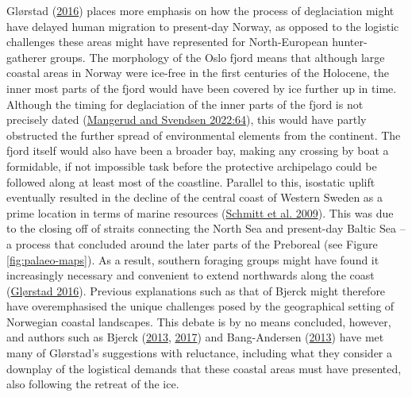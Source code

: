 \documentclass[
  12pt,
  a4paper,
  oneside]{book}
\begin{document}
Glørstad (\protect\hyperlink{ref-glorstad2016}{2016}) places more emphasis on how the process of deglaciation might have delayed human migration to present-day Norway, as opposed to the logistic challenges these areas might have represented for North-European hunter-gatherer groups. The morphology of the Oslo fjord means that although large coastal areas in Norway were ice-free in the first centuries of the Holocene, the inner most parts of the fjord would have been covered by ice further up in time. Although the timing for deglaciation of the inner parts of the fjord is not precisely dated (\protect\hyperlink{ref-mangerud2022}{Mangerud and Svendsen 2022:64}), this would have partly obstructed the further spread of environmental elements from the continent. The fjord itself would also have been a broader bay, making any crossing by boat a formidable, if not impossible task before the protective archipelago could be followed along at least most of the coastline. Parallel to this, isostatic uplift eventually resulted in the decline of the central coast of Western Sweden as a prime location in terms of marine resources (\protect\hyperlink{ref-schmitt2009}{Schmitt et al. 2009}). This was due to the closing off of straits connecting the North Sea and present-day Baltic Sea -- a process that concluded around the later parts of the Preboreal (see Figure \ref{fig:palaeo-maps}). As a result, southern foraging groups might have found it increasingly necessary and convenient to extend northwards along the coast (\protect\hyperlink{ref-glorstad2016}{Glørstad 2016}). Previous explanations such as that of Bjerck might therefore have overemphasised the unique challenges posed by the geographical setting of Norwegian coastal landscapes. This debate is by no means concluded, however, and authors such as Bjerck (\protect\hyperlink{ref-bjerck2013}{2013}, \protect\hyperlink{ref-bjerck2017}{2017}) and Bang-Andersen (\protect\hyperlink{ref-bang-andersen2013}{2013}) have met many of Glørstad's suggestions with reluctance, including what they consider a downplay of the logistical demands that these coastal areas must have presented, also following the retreat of the ice.
\end{document}
